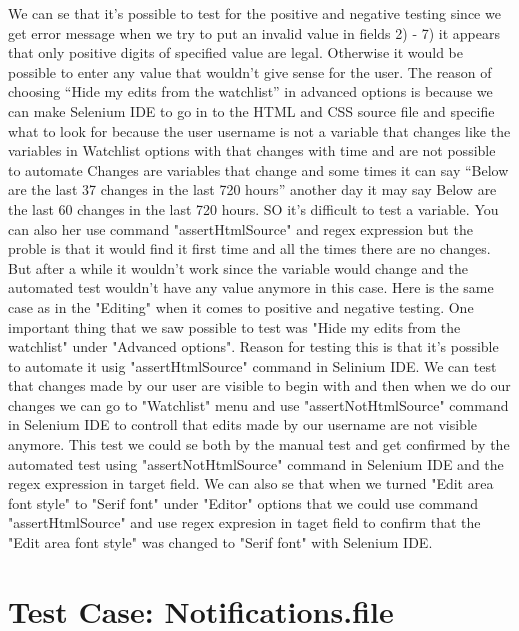 \documentclass[a4paper,10pt]{article}
\begin{document}
We can se that it’s possible to test for the positive and negative testing since we get error message when we
try to put an invalid value in fields 2) - 7) it appears that only positive digits of specified value are legal. Otherwise
it would be possible to enter any value that wouldn’t give sense for the user. The reason of choosing “Hide my edits from the watchlist” in 			advanced options is because we can make Selenium IDE to go in to the HTML and CSS source file and specifie what to look for because the user 
username is not a variable that changes like the variables in Watchlist options with that changes with time and are not possible to automate
Changes are variables that change and some times it can say “Below are the last 37 changes in the last 720 hours” another day it may say
Below are the last 60 changes in the last 720 hours. SO it’s difficult to test a variable. You can also her use command 
"assertHtmlSource" and regex expression but the proble is that it would find it first time and all the times there are no
changes. But after a while it wouldn't work since the variable would change and the automated test wouldn't have any
value anymore in this case. 
Here is the same case as in the "Editing" when it comes to positive and negative testing. One important thing that
we saw possible to test was "Hide my edits from the watchlist" under "Advanced options". Reason for testing this is that it's
possible to automate it usig "assertHtmlSource" command in Selinium IDE. We can test that changes made by our user are visible 
to begin with and then when we do our changes we can go to "Watchlist" menu and use "assertNotHtmlSource" command in Selenium IDE
to controll that  edits made by our username are not visible anymore. This test we could se both by the manual test and get
confirmed by the automated test using "assertNotHtmlSource" command in Selenium IDE and the regex expression in target field.
We can also se that when we turned "Edit area font style" to "Serif font" under "Editor" options that we could use command
 "assertHtmlSource" and use regex expresion in taget field to confirm that the "Edit area font style" was changed to "Serif font" 
with Selenium IDE.


\section{Test Case: Notifications.file}
\end{document}
